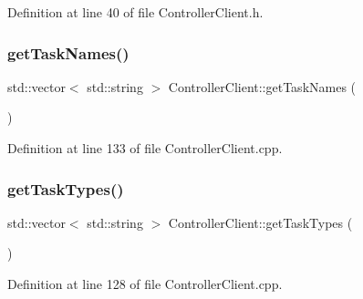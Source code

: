 Definition at line 40 of file Controller\+Client.\+h.

\hypertarget{classocra__recipes_1_1ControllerClient_a96ece5fcbcdffcd43c93905ffce5f54a}{}\label{classocra__recipes_1_1ControllerClient_a96ece5fcbcdffcd43c93905ffce5f54a} 
\subsubsection{\texorpdfstring{get\+Task\+Names()}{getTaskNames()}}
{\footnotesize\ttfamily std\+::vector$<$ std\+::string $>$ Controller\+Client\+::get\+Task\+Names (\begin{DoxyParamCaption}{ }\end{DoxyParamCaption})}



Definition at line 133 of file Controller\+Client.\+cpp.

\hypertarget{classocra__recipes_1_1ControllerClient_a53b0b53fc4c46f195c9f6dd2d1a6506c}{}\label{classocra__recipes_1_1ControllerClient_a53b0b53fc4c46f195c9f6dd2d1a6506c} 
\subsubsection{\texorpdfstring{get\+Task\+Types()}{getTaskTypes()}}
{\footnotesize\ttfamily std\+::vector$<$ std\+::string $>$ Controller\+Client\+::get\+Task\+Types (\begin{DoxyParamCaption}{ }\end{DoxyParamCaption})}



Definition at line 128 of file Controller\+Client.\+cpp.

\hypertarget{classocra__recipes_1_1ControllerClient_a8c83005b1be831bc230d5a441f88980d}{}\label{classocra__recipes_1_1ControllerClient_a8c83005b1be831bc230d5a441f88980d} 
